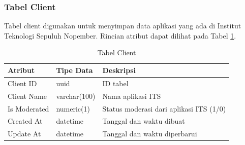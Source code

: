 \subsubsection{Tabel Client}
\par Tabel client digunakan untuk menyimpan data aplikasi yang ada di Institut Teknologi Sepuluh Nopember. Rincian atribut dapat dilihat pada Tabel \ref{tabel_client}.
\begin{longtable}{|p{2cm}|p{2.5cm}|p{4.5cm}|}
	\caption{Tabel Client} \label{tabel_client} \\ \hline
    {Atribut} & {Tipe Data} & {Deskripsi} \\ \hline
    Client ID & uuid & ID tabel \\ \hline
    Client Name & varchar(100) & Nama aplikasi ITS \\ \hline
    Is Moderated & numeric(1) & Status moderasi dari aplikasi ITS (1/0) \\ \hline
    Created At & datetime & Tanggal dan waktu dibuat \\ \hline
    Update At & datetime & Tanggal dan waktu diperbarui \\ \hline
\end{longtable}

